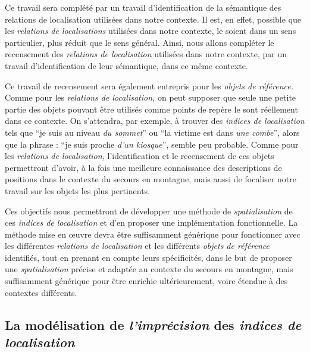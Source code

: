 Ce travail sera complété par un travail d'identification de la
sémantique des relations de localisation utilisées dans notre
contexte. Il est, en effet, possible que les \emph{relations de
  localisations} utilisées dans notre contexte, le soient dans un sens
particulier, plus réduit que le sens général. Ainsi, nous allons
compléter le recensement des \emph{relations de localisation}
utilisées dans notre contexte, par un travail d'identification de leur
sémantique, dans ce même contexte.

Ce travail de recensement sera également entrepris pour les
\emph{objets de référence.} Comme pour les \emph{relations de
  localisation,} on peut supposer que seule une petite partie des
objets pouvant être utilisés comme points de repère le sont réellement
dans ce contexte. On s'attendra, par exemple, à trouver des
\emph{indices de localisation} tels que \enquote{je suis au niveau
  \emph{du sommet}} ou \enquote{la victime est dans \emph{une combe}},
alors que la phrase : \enquote{je suis proche \emph{d'un kiosque}},
semble peu probable. Comme pour les \emph{relations de localisation,}
l'identification et le recensement de ces objets permettront d'avoir,
à la fois une meilleure connaissance des descriptions de positions
dans le contexte du secours en montagne, mais aussi de focaliser notre
travail sur les objets les plus pertinents.

Ces objectifs nous permettront de développer une méthode de
\emph{spatialisation} de ces \emph{indices de localisation} et d'en
proposer une implémentation fonctionnelle. La méthode mise en œuvre
devra être suffisamment générique pour fonctionner avec les
différentes \emph{relations de localisation} et les différents
\emph{objets de référence} identifiés, tout en prenant en compte leurs
spécificités, dans le but de proposer une \emph{spatialisation}
précise et adaptée au contexte du secours en montagne, mais
suffisamment générique pour être enrichie ultérieurement, voire
étendue à des contextes différents.

\subsection{La modélisation de \emph{l'imprécision} des \emph{indices
    de localisation}}
\label{subsec:2-1-2}


